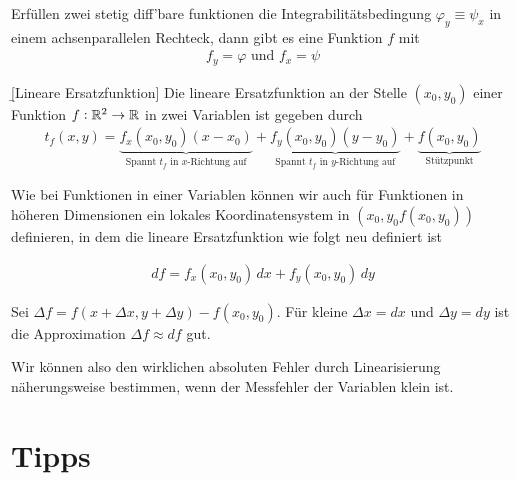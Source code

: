 \documentclass[12pt]{article}
\begin{document}
\begin{fct}
        Erfüllen zwei stetig diff'bare funktionen die Integrabilitätsbedingung $\varphi_y\equiv\psi_x$ in einem achsenparallelen Rechteck, dann gibt es eine Funktion $f$ mit
        \begin{align}
                f_y=\varphi\text{ und }f_x=\psi
        \end{align}
\end{fct}

\begin{defn}{\b{[Lineare Ersatzfunktion]}}
        Die lineare Ersatzfunktion an der Stelle $(x_0,y_0)$ einer Funktion $f:\mathbb{R}^2\to\mathbb{R}$ in zwei Variablen ist gegeben durch
        \begin{align}
                t_f(x,y)=\underbrace{f_x(x_0,y_0)(x-x_0)}_{\text{Spannt $t_f$ in $x$-Richtung auf}}+\underbrace{f_y(x_0,y_0)(y-y_0)}_{\text{Spannt $t_f$ in $y$-Richtung auf}}+\underbrace{f(x_0,y_0)}_{\text{Stützpunkt}}
        \end{align}
\end{defn}

Wie bei Funktionen in einer Variablen können wir auch für Funktionen in höheren
Dimensionen ein lokales Koordinatensystem in $(x_0,y_0f(x_0,y_0))$ definieren,
in dem die lineare Ersatzfunktion wie folgt neu definiert ist\vspace*{0.3em}

\begin{thmb}{}
        \begin{align}
                df = f_x(x_0,y_0)\,dx+f_y(x_0,y_0)\,dy
        \end{align}
\end{thmb}\vspace*{1em}

\begin{fct}
        Sei $\Delta f=f(x+\Delta x,y+\Delta y)-f(x_0,y_0)$. Für kleine $\Delta x = dx$ und $\Delta y = dy$ ist die Approximation $\Delta f \approx df$ gut.
\end{fct}

Wir können also den wirklichen absoluten Fehler durch Linearisierung näherungsweise bestimmen, wenn der Messfehler der Variablen klein ist.

\section{Tipps}
\end{document}
